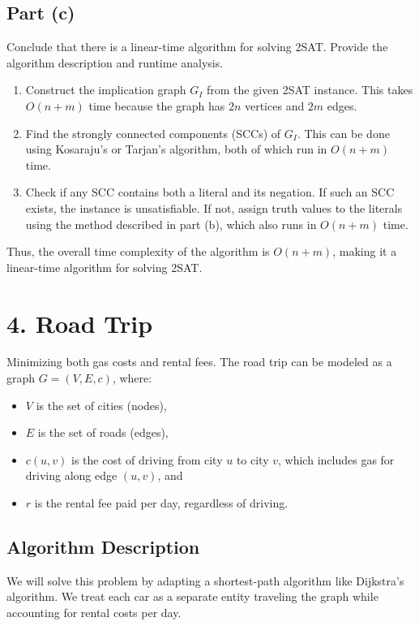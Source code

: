 \documentclass[11pt]{article}
\begin{document}
\subsection*{Part (c)}
Conclude that there is a linear-time algorithm for solving 2SAT. Provide the algorithm description and runtime analysis.


\begin{enumerate}
    \item Construct the implication graph \( G_I \) from the given 2SAT instance. This takes \( O(n + m) \) time because the graph has \( 2n \) vertices and \( 2m \) edges.
    \item Find the strongly connected components (SCCs) of \( G_I \). This can be done using Kosaraju's or Tarjan's algorithm, both of which run in \( O(n + m) \) time.
    \item Check if any SCC contains both a literal and its negation. If such an SCC exists, the instance is unsatisfiable. If not, assign truth values to the literals using the method described in part (b), which also runs in \( O(n + m) \) time.
\end{enumerate}

Thus, the overall time complexity of the algorithm is \( O(n + m) \), making it a linear-time algorithm for solving 2SAT.


\newpage

\section*{4. Road Trip}

Minimizing both gas costs and rental fees. The road trip can be modeled as a graph \( G = (V, E, c) \), where:

\begin{itemize}
    \item \( V \) is the set of cities (nodes),
    \item \( E \) is the set of roads (edges),
    \item \( c(u, v) \) is the cost of driving from city \( u \) to city \( v \), which includes gas for driving along edge \( (u, v) \), and
    \item \( r \) is the rental fee paid per day, regardless of driving.
\end{itemize}


\subsection*{Algorithm Description}
We will solve this problem by adapting a shortest-path algorithm like Dijkstra's algorithm. We treat each car as a separate entity traveling the graph while accounting for rental costs per day.
\end{document}
